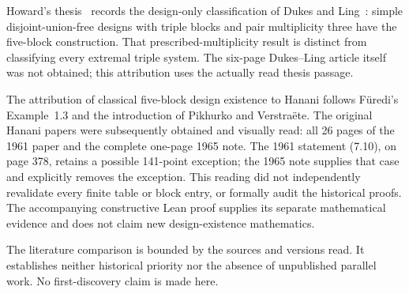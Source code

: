 Howard's thesis~\cite[printed p.~9]{howard} records the design-only classification of Dukes and Ling~\cite{dukesling}: simple disjoint-union-free designs with triple blocks and pair multiplicity three have the five-block construction. That prescribed-multiplicity result is distinct from classifying every extremal triple system. The six-page Dukes--Ling article itself was not obtained; this attribution uses the actually read thesis passage.

The attribution of classical five-block design existence to Hanani follows F\"uredi's Example~1.3 and the introduction of Pikhurko and Verstra\"ete. The original Hanani papers were subsequently obtained and visually read: all 26 pages of the 1961 paper and the complete one-page 1965 note. The 1961 statement (7.10), on page 378, retains a possible 141-point exception; the 1965 note supplies that case and explicitly removes the exception. This reading did not independently revalidate every finite table or block entry, or formally audit the historical proofs. The accompanying constructive Lean proof supplies its separate mathematical evidence and does not claim new design-existence mathematics.

The literature comparison is bounded by the sources and versions read. It establishes neither historical priority nor the absence of unpublished parallel work. No first-discovery claim is made here.
